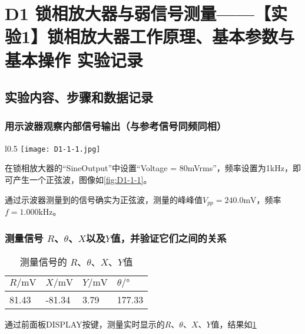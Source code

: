 \documentclass[dvipsnames, svgnames,a4paper,11pt]{article}
\begin{document}
\section{D1 \quad 锁相放大器与弱信号测量——【实验1】锁相放大器工作原理、基本参数与基本操作 \quad\heiti 实验记录}
\subsection{实验内容、步骤和数据记录}

	\subsubsection{用示波器观察内部信号输出（与参考信号同频同相）}
	
	\begin{wrapfigure}{l}{0.5\textwidth}
		\centering
		\texttt{[image: D1-1-1.jpg]}
		\caption{用示波器观察内部信号输出}
		\label{fig:D1-1-1}
	\end{wrapfigure}

	在锁相放大器的“SineOutput”中设置“Voltage = 80mVrms”，频率设置为1kHz，即可产生一个正弦波，图像如\cref{fig:D1-1-1}。

	通过示波器测量到的信号确实为正弦波，测量的峰峰值$V_{pp} = 240.0 \text{mV}$，频率$f = 1.000 \text{kHz}$。




	\clearpage
	\subsubsection{测量信号 $R$、$\theta$、$X$以及$Y$值，并验证它们之间的关系}


	\begin{table}[htbp]
		\centering
		\begin{tabular}{|llll|} 
		\hline
		$R/\text{mV}$  & $X/\text{mV}$   & $Y/\text{mV}$ & $\theta/°$  \\ 
		\hline
		81.43 & -81.34 & 3.79 & 177.33   \\
		\hline
		\end{tabular}
		\caption{测量信号的 $R$、$\theta$、$X$、$Y$值}
		\label{tbl:D1-2-1}
	\end{table}

	通过前面板DISPLAY按键，测量实时显示的$R$、$\theta$、$X$、$Y$值，结果如\cref{tbl:D1-2-1}
\end{document}
